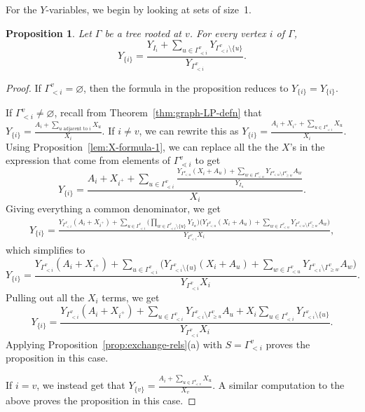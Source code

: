 \documentclass[pdftex]{sigma}
\numberwithin{equation}{section}
\newtheorem{Proposition}[Theorem]{Proposition}
 { \theoremstyle{definition}
\newtheorem{Definition}[Theorem]{Definition}
\newtheorem{Note}[Theorem]{Note}
\newtheorem{Example}[Theorem]{Example}
\newtheorem{Remark}[Theorem]{Remark} }
\newcommand{\new}[1]{{#1}}
\begin{document}
For the $Y$-variables, we begin by looking at sets of size~1.

\begin{Proposition}\label{prop:Y-single-formula}
Let $\Gamma$ be a tree rooted at $v$. For every vertex $i$ of $\Gamma$,
\[ Y_{\{i\}}=\frac{Y_{I_i}+\sum_{u\in\Gamma_{\lessdot i}^v}Y_{\Gamma_{< i}^v\setminus\{u\}}}{Y_{\Gamma_{< i}^v}}.\]
\end{Proposition}

\begin{proof}
If $\Gamma_{< i}^v=\varnothing$, then the formula in the proposition reduces to $Y_{\{i\}}=Y_{\{i\}}$.

If $\Gamma_{< i}^v\neq\varnothing$, recall from Theorem~\ref{thm:graph-LP-defn} that $Y_{\{i\}}=\frac{A_i+\sum_{u\text{ adjacent to }i}X_u}{X_i}$. If $i\neq v$, we can rewrite this as $Y_{\{i\}}=\frac{A_i+X_{i^+}+\sum_{u\in\Gamma_{\lessdot i}^v}X_u}{X_i}$. Using Proposition~\ref{lem:X-formula-1}, we can replace all the the $X$'s in the expression that come from elements of $\Gamma_{\lessdot i}^v$ to get
\[ Y_{\{i\}}=\frac{A_i+X_{i^+}+\sum_{u\in\Gamma_{\lessdot i}^v}\frac{Y_{\Gamma_{< u}^v}(X_i+A_u)+\sum_{w\in \Gamma_{< u}^v}Y_{\Gamma_{< u}^v\setminus\Gamma_{\geq w}^v}A_w}{Y_{I_u}}}{X_i}.\]
Giving everything a common denominator, we get
\begin{gather*}
 Y_{\{i\}}=\frac{Y_{\Gamma_{< i}^v}(A_i+X_{i^+})+\sum\limits_{u\in\Gamma_{\lessdot i}^v}\Big(\prod\limits_{w\in\Gamma_{\lessdot i}^v\setminus\{u\}}Y_{I_w}\Big)\Big(Y_{\Gamma_{< u}^v}(X_i+A_u)+\sum\limits_{w\in \Gamma_{< u}^v}Y_{\Gamma_{< u}^v\setminus\Gamma_{\geq w}^v}A_w\Big)}{Y_{\Gamma_{< i}^v}X_i},
 \end{gather*}
which simplifies to
\[ Y_{\{i\}}=\frac{Y_{\Gamma_{< i}^v}(A_i+X_{i^+})+\sum_{u\in\Gamma_{\lessdot i}^v}\Big(Y_{\Gamma_{< i}^v\setminus\{u\}}(X_i+A_u)+\sum_{w\in \Gamma_{< u}^v}Y_{\Gamma_{< i}^v\setminus\Gamma_{\geq w}^v}A_w\Big)}{Y_{\Gamma_{< i}^v}X_i}.\]
Pulling out all the $X_i$ terms, we get
\[ Y_{\{i\}}=\frac{Y_{\Gamma_{< i}^v}(A_i+X_{i^+})+\sum_{u\in\Gamma_{< i}^v}Y_{\Gamma_{< i}^v\setminus\Gamma_{\geq u}^v}A_u+X_i\sum_{u\in\Gamma_{\lessdot i}^v}Y_{\Gamma_{< i}^v\setminus\{u\}}}{Y_{\Gamma_{< i}^v}X_i}.\]
Applying Proposition~\ref{prop:exchange-rels}(a) with $S=\Gamma_{< i}^v$ proves the \new{proposition} in this case.

If $i=v$, we instead get that $Y_{\{v\}}=\frac{A_i+\sum_{u\in\Gamma_{\lessdot v}^v}X_u}{X_v}$. A similar computation to the above proves the \new{proposition} in this case.
\end{proof}
\end{document}
